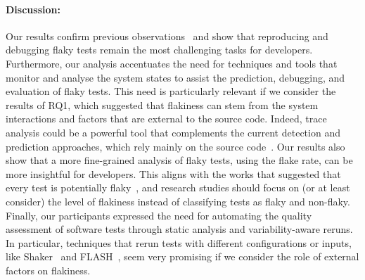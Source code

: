 \paragraph{\textbf{Discussion:}}
Our results confirm previous observations~\cite{eck_understanding_2019,Lam2019RootCausing,Lam2020UnderstandingReproducibility} and show that reproducing and debugging flaky tests remain the most challenging tasks for developers.
Furthermore, our analysis accentuates the need for techniques and tools that monitor and analyse the system states to assist the prediction, debugging, and evaluation of flaky tests.
This need is particularly relevant if we consider the results of \textsc{RQ1}, which suggested that flakiness can stem from the system interactions and factors that are external to the source code.
Indeed, trace analysis could be a powerful tool that complements the current detection and prediction approaches, which rely mainly on the source code~\cite{bell_deflaker_2018,lam_idflakies_2019,Pinto2020,King2018,Bertolino2020}.
Our results also show that a more fine-grained analysis of flaky tests, using the flake rate, can be more insightful for developers. 
This aligns with the works that suggested that every test is potentially flaky~\cite{harman2018start}, and research studies should focus on (or at least consider) the level of flakiness instead of classifying tests as flaky and non-flaky.
Finally, our participants expressed the need for automating the quality assessment of software tests through static analysis and variability-aware reruns.
In particular, techniques that rerun tests with different configurations or inputs, like Shaker~\cite{Silva2020} and FLASH~\cite{dutta_detecting_2020}, seem very promising if we consider the role of external factors on flakiness.